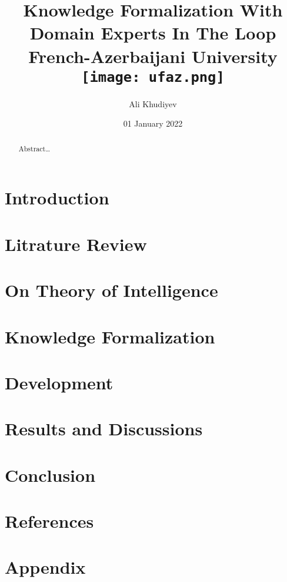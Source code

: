 \documentclass[12pt,twoside]{report}
\title{
	{Knowledge Formalization With Domain Experts In The Loop} \\
	{\large French-Azerbaijani University} \\
	{\texttt{[image: ufaz.png]}}
}
\author{Ali Khudiyev}
\date{01 January 2022}
\begin{document}
\maketitle

\begin{abstract}
	Abstract\ldots
\end{abstract}

\tableofcontents

\chapter{Introduction}


\chapter{Litrature Review}


\chapter{On Theory of Intelligence}


\chapter{Knowledge Formalization}


\chapter{Development}


\chapter{Results and Discussions}


\chapter{Conclusion}


\chapter{References}


\appendix
\chapter{Appendix}

\end{document}
